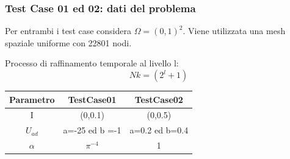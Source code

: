 \documentclass{beamer}
\theoremstyle{definition}
\theoremstyle{remark}
\theoremstyle{plain}
\theoremstyle{definition}
\begin{document}
\begin{frame}
\frametitle{Test Case 01 ed 02: dati del problema}

Per entrambi i test case considera $\Omega = (0,1)^2$.
Viene utilizzata una mesh spaziale uniforme con 22801 nodi.

Processo di raffinamento temporale al livello l: 
\begin{equation*}
Nk = ( 2^l + 1 )
\label{Nk}
\end{equation*}

\begin{table}
\centering
\begin{tabular}{|c|c|c|}
\hline
\textbf{Parametro} & \textbf{TestCase01} & \textbf{TestCase02} \\
\hline
I & (0,0.1) & (0,0.5) \\
\hline
$U_{ad}$ & a=-25 ed b =-1 & a=0.2 ed b=0.4 \\
\hline
$\alpha$ & $\pi^{-4}$ & 1 \\
\hline
\end{tabular}
\end{table}

\end{frame}
\end{document}
